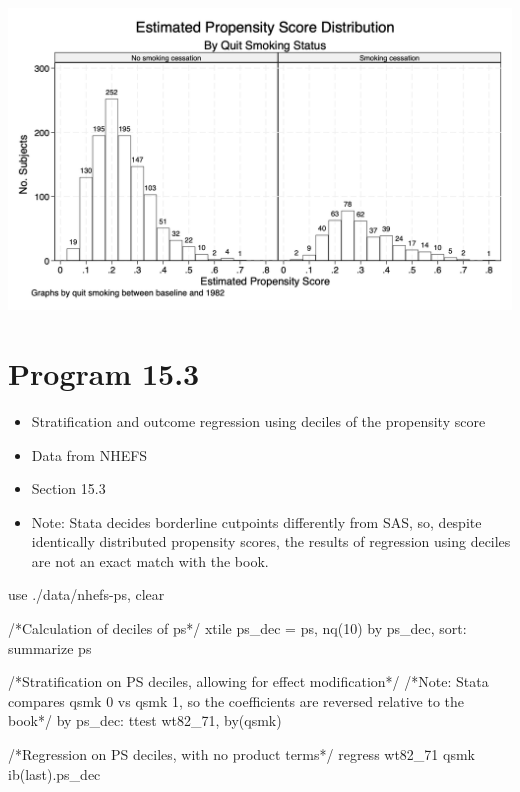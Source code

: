\documentclass[
  10pt,
  a4paper,
]{book}
\newenvironment{Shaded}{\begin{snugshade}}{\end{snugshade}}
\newcommand{\CommentTok}[1]{\textcolor[rgb]{0.37,0.37,0.37}{#1}}
\newcommand{\FunctionTok}[1]{\textcolor[rgb]{0.28,0.35,0.67}{#1}}
\newcommand{\KeywordTok}[1]{\textcolor[rgb]{0.00,0.46,0.62}{#1}}
\newcommand{\NormalTok}[1]{\textcolor[rgb]{0.00,0.46,0.62}{#1}}
\providecommand{\tightlist}{%
  \setlength{\itemsep}{0pt}\setlength{\parskip}{0pt}}
\begin{document}
\begin{center}\includegraphics[width=0.85\linewidth]{./figs/stata-fig-15-2} \end{center}

\section{Program 15.3}\label{program-15.3-1}

\begin{itemize}
\tightlist
\item
  Stratification and outcome regression using deciles of the propensity score
\item
  Data from NHEFS
\item
  Section 15.3
\item
  Note: Stata decides borderline cutpoints differently from SAS, so, despite identically distributed propensity scores, the results of regression using deciles are not an exact match with the book.
\end{itemize}

\begin{Shaded}
\begin{Highlighting}[]
\KeywordTok{use}\NormalTok{ ./}\KeywordTok{data}\NormalTok{/nhefs{-}ps, }\KeywordTok{clear}

\CommentTok{/*Calculation of deciles of ps*/}
\KeywordTok{xtile}\NormalTok{ ps\_dec = ps, nq(10)}
\KeywordTok{by}\NormalTok{ ps\_dec, }\KeywordTok{sort}\NormalTok{: }\KeywordTok{summarize}\NormalTok{ ps}

\CommentTok{/*Stratification on PS deciles, allowing for effect modification*/}
\CommentTok{/*Note: Stata compares qsmk 0 vs qsmk 1, so the coefficients are reversed }
\CommentTok{relative to the book*/}
\KeywordTok{by}\NormalTok{ ps\_dec: }\KeywordTok{ttest}\NormalTok{ wt82\_71, }\KeywordTok{by}\NormalTok{(qsmk)}

\CommentTok{/*Regression on PS deciles, with no product terms*/}
\KeywordTok{regress}\NormalTok{ wt82\_71 qsmk ib(}\FunctionTok{last}\NormalTok{).ps\_dec}
\end{Highlighting}
\end{Shaded}
\end{document}
